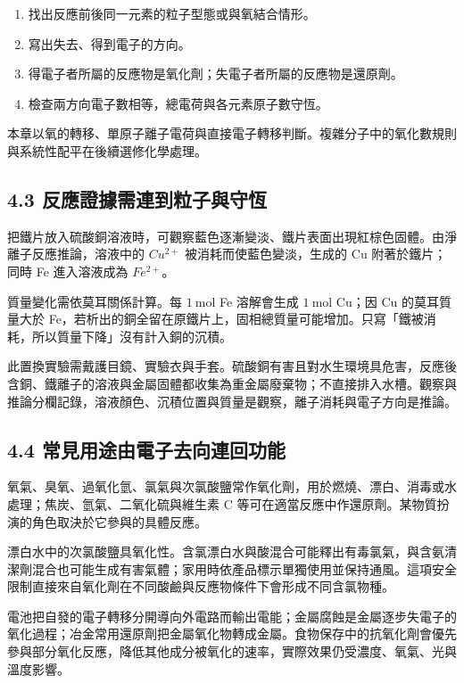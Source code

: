 \documentclass[11pt,a4paper]{article}
\providecommand{\tightlist}{%
  \setlength{\itemsep}{0pt}\setlength{\parskip}{0pt}}
\begin{document}
\begin{enumerate}
\def\labelenumi{\arabic{enumi}.}
\tightlist
\item
  找出反應前後同一元素的粒子型態或與氧結合情形。
\item
  寫出失去、得到電子的方向。
\item
  得電子者所屬的反應物是氧化劑；失電子者所屬的反應物是還原劑。
\item
  檢查兩方向電子數相等，總電荷與各元素原子數守恆。
\end{enumerate}

本章以氧的轉移、單原子離子電荷與直接電子轉移判斷。複雜分子中的氧化數規則與系統性配平在後續選修化學處理。

\subsection{4.3 反應證據需連到粒子與守恆}\label{ux53cdux61c9ux8b49ux64daux9700ux9023ux5230ux7c92ux5b50ux8207ux5b88ux6046}

把鐵片放入硫酸銅溶液時，可觀察藍色逐漸變淡、鐵片表面出現紅棕色固體。由淨離子反應推論，溶液中的 \(Cu^{2+}\) 被消耗而使藍色變淡，生成的 Cu 附著於鐵片；同時 Fe 進入溶液成為 \(Fe^{2+}\)。

質量變化需依莫耳關係計算。每 \(1\ \mathrm{mol}\) Fe 溶解會生成 \(1\ \mathrm{mol}\) Cu；因 Cu 的莫耳質量大於 Fe，若析出的銅全留在原鐵片上，固相總質量可能增加。只寫「鐵被消耗，所以質量下降」沒有計入銅的沉積。

此置換實驗需戴護目鏡、實驗衣與手套。硫酸銅有害且對水生環境具危害，反應後含銅、鐵離子的溶液與金屬固體都收集為重金屬廢棄物；不直接排入水槽。觀察與推論分欄記錄，溶液顏色、沉積位置與質量是觀察，離子消耗與電子方向是推論。

\subsection{4.4 常見用途由電子去向連回功能}\label{ux5e38ux898bux7528ux9014ux7531ux96fbux5b50ux53bbux5411ux9023ux56deux529fux80fd}

氧氣、臭氧、過氧化氫、氯氣與次氯酸鹽常作氧化劑，用於燃燒、漂白、消毒或水處理；焦炭、氫氣、二氧化硫與維生素 C 等可在適當反應中作還原劑。某物質扮演的角色取決於它參與的具體反應。

漂白水中的次氯酸鹽具氧化性。含氯漂白水與酸混合可能釋出有毒氯氣，與含氨清潔劑混合也可能生成有害氣體；家用時依產品標示單獨使用並保持通風。這項安全限制直接來自氧化劑在不同酸鹼與反應物條件下會形成不同含氯物種。

電池把自發的電子轉移分開導向外電路而輸出電能；金屬腐蝕是金屬逐步失電子的氧化過程；冶金常用還原劑把金屬氧化物轉成金屬。食物保存中的抗氧化劑會優先參與部分氧化反應，降低其他成分被氧化的速率，實際效果仍受濃度、氧氣、光與溫度影響。
\end{document}
